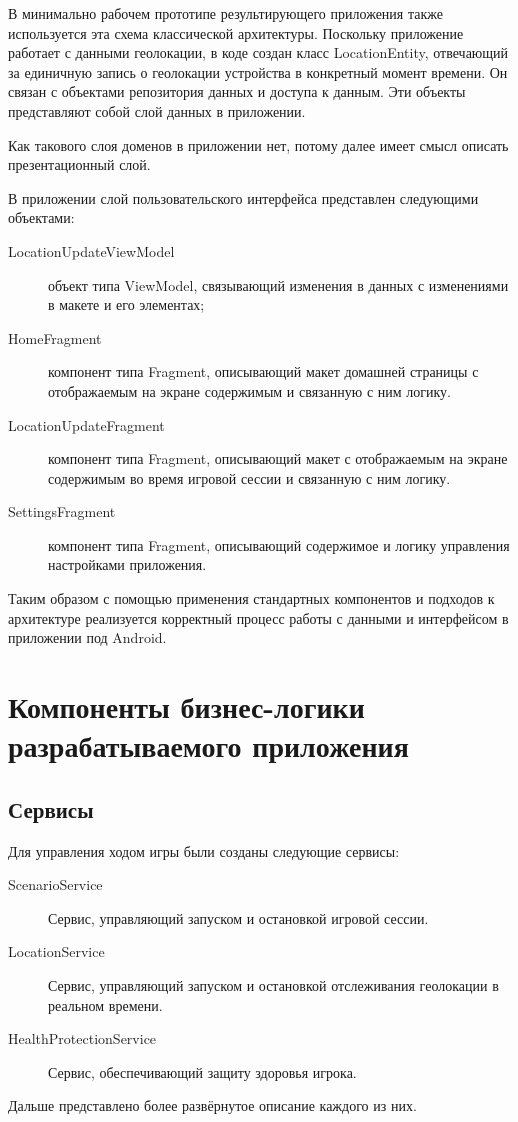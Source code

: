 В минимально рабочем прототипе результирующего приложения также используется эта схема классической архитектуры.
Поскольку приложение работает с данными геолокации, в коде создан класс LocationEntity, отвечающий за единичную запись о геолокации устройства в конкретный момент времени. 
Он связан с объектами репозитория данных и доступа к данным. 
Эти объекты представляют собой слой данных в приложении.

Как такового слоя доменов в приложении нет, потому далее имеет смысл описать презентационный слой.

В приложении слой пользовательского интерфейса представлен следующими объектами:
\begin{description}
	\item[LocationUpdateViewModel] объект типа ViewModel, связывающий изменения в данных с изменениями в макете и его элементах;
	\item[HomeFragment] компонент типа Fragment, описывающий макет домашней страницы с отображаемым на экране содержимым и связанную с ним логику.
	\item[LocationUpdateFragment] компонент типа Fragment, описывающий макет с отображаемым на экране содержимым во время игровой сессии и связанную с ним логику.
	\item[SettingsFragment] компонент типа Fragment, описывающий содержимое и логику управления настройками приложения.
\end{description}

Таким образом с помощью применения стандартных компонентов и подходов к архитектуре реализуется корректный процесс работы с данными и интерфейсом в приложении под Android. 


\section{Компоненты бизнес-логики разрабатываемого приложения}
\subsection*{Сервисы}
Для управления ходом игры были созданы следующие сервисы:
\begin{description}
	\item[ScenarioService] Сервис, управляющий запуском и остановкой игровой сессии.
	\item[LocationService] Сервис, управляющий запуском и остановкой отслеживания геолокации в реальном времени.
	\item[HealthProtectionService] Сервис, обеспечивающий защиту здоровья игрока.
\end{description}
\smallskip
Дальше представлено более развёрнутое описание каждого из них.

